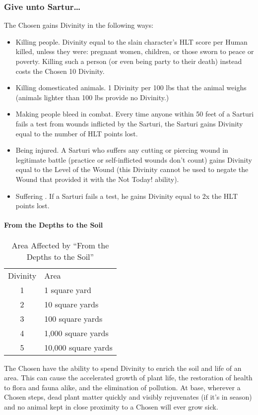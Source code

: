 \documentclass[oneside,11pt,english]{book}
\begin{document}
\subsubsection{Give unto Sartur\dots} 
The Chosen gains Divinity in the following ways: 
\begin{itemize}
\item Killing people. Divinity equal to the slain character's HLT score per Human killed, 
unless they were: pregnant women, children, or those sworn to peace or poverty. Killing 
such a person (or even being party to their death) instead costs the Chosen 10 Divinity. 
\item Killing domesticated animals. 1 Divinity per 100 lbs that the animal weighs (animals 
lighter than 100 lbs provide no Divinity.) 
\item Making people bleed in combat. Every time anyone within 50 feet of a Sarturi fails a 
 test from wounds inflicted by the Sarturi, the Sarturi gains Divinity equal to 
the number of HLT points lost. 
\item Being injured. A Sarturi who suffers any cutting or piercing wound in legitimate battle 
(practice or self-inflicted wounds don't count) gains Divinity equal to the Level of the 
Wound (this Divinity cannot be used to negate the Wound that provided it with the Not 
Today! ability). 
\item Suffering . If a Sarturi fails a  test, he gains Divinity equal to 2x 
the HLT points lost. 
\end{itemize}
\paragraph{From the Depths to the Soil}
\begin{wraptable}{r}{7 cm}
	\caption{Area Affected by ``From the Depths to the Soil''}
	\label{tab:sarturflowerpower}
	\begin{tabu} spread 0pt {cX}
		Divinity&Area\\
		1&1 square yard\\
		2&10 square yards\\
		3&100 square yards\\
		4&1,000 square yards\\
		5&10,000 square yards\\
	\end{tabu}
\end{wraptable}
The Chosen have the ability to spend Divinity to enrich the soil and life of an area. This can cause 
the accelerated growth of plant life, the restoration of health to flora and fauna alike, and the 
elimination of pollution. At base, wherever a Chosen steps, dead plant matter quickly and visibly 
rejuvenates (if it's in season) and no animal kept in close proximity to a Chosen will ever grow 
sick. 
\end{document}
